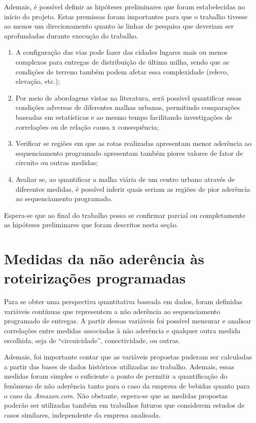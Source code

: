 Ademais, é possível definir as hipóteses preliminares que foram estabelecidas no início do projeto.
Estas premissas foram importantes para que o trabalho tivesse ao menos um direcionamento quanto às linhas de pesquisa que deveriam ser aprofundadas durante execução do trabalho.
%
\begin{enumerate}
    \item A configuração das vias pode fazer das cidades lugares mais ou menos complexos para entregas de distribuição de última milha, sendo que as condições de terreno também podem afetar essa complexidade (relevo, elevação, etc.);
    \item Por meio de abordagens vistas na literatura, será possível quantificar essas condições adversas de diferentes malhas urbanas, permitindo comparações baseadas em estatísticas e ao mesmo tempo facilitando investigações de correlações ou de relação causa x consequência;
    \item Verificar se regiões em que as rotas realizadas apresentam menor aderência ao sequenciamento programado apresentam também piores valores de fator de circuito ou outras medidas;
    \item Avaliar se, ao quantificar a malha viária de um centro urbano através de diferentes medidas, é possível inferir quais seriam as regiões de pior aderência ao sequenciamento programado. 
\end{enumerate}

Espera-se que ao final do trabalho possa se confirmar parcial ou completamente as hipóteses preliminares que foram descritos nesta seção.

\section{Medidas da não aderência às roteirizações programadas} \label{sec:variaveis_do_problema}

Para se obter uma perspectiva quantitativa baseada em dados, foram definidas variáveis contínuas que representem a não aderência ao sequenciamento programado de entregas.
A partir dessas variáveis foi possível mensurar e analisar correlações entre medidas associadas à não aderência e qualquer outra medida escolhida, seja de ``circuicidade'', conectividade, ou outras.

Ademais, foi importante contar que as variáveis propostas puderam ser calculadas a partir das bases de dados históricos utilizadas no trabalho. 
Ademais, essas medidas foram simples o suficiente a ponto de permitir a quantificação do fenômeno de não aderência tanto para o caso da empresa de bebidas quanto para o caso da \textit{Amazon.com}.
Não obstante, espera-se que as medidas propostas poderão ser utilizadas também em trabalhos futuros que considerem estudos de casos similares, independente da empresa analisada.

